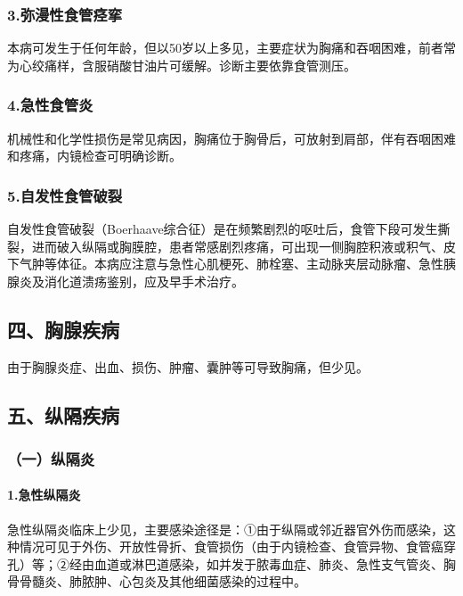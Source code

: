 \subsubsection{3.弥漫性食管痉挛}

本病可发生于任何年龄，但以50岁以上多见，主要症状为胸痛和吞咽困难，前者常为心绞痛样，含服硝酸甘油片可缓解。诊断主要依靠食管测压。

\subsubsection{4.急性食管炎}

机械性和化学性损伤是常见病因，胸痛位于胸骨后，可放射到肩部，伴有吞咽困难和疼痛，内镜检查可明确诊断。

\subsubsection{5.自发性食管破裂}

自发性食管破裂（Boerhaave综合征）是在频繁剧烈的呕吐后，食管下段可发生撕裂，进而破入纵隔或胸膜腔，患者常感剧烈疼痛，可出现一侧胸腔积液或积气、皮下气肿等体征。本病应注意与急性心肌梗死、肺栓塞、主动脉夹层动脉瘤、急性胰腺炎及消化道溃疡鉴别，应及早手术治疗。

\protect\hypertarget{text00097.html}{}{}

\subsection{四、胸腺疾病}

由于胸腺炎症、出血、损伤、肿瘤、囊肿等可导致胸痛，但少见。

\protect\hypertarget{text00098.html}{}{}

\subsection{五、纵隔疾病}

\subsubsection{（一）纵隔炎}

\paragraph{1.急性纵隔炎}

急性纵隔炎临床上少见，主要感染途径是：①由于纵隔或邻近器官外伤而感染，这种情况可见于外伤、开放性骨折、食管损伤（由于内镜检查、食管异物、食管癌穿孔）等；②经由血道或淋巴道感染，如并发于脓毒血症、肺炎、急性支气管炎、胸骨骨髓炎、肺脓肿、心包炎及其他细菌感染的过程中。

